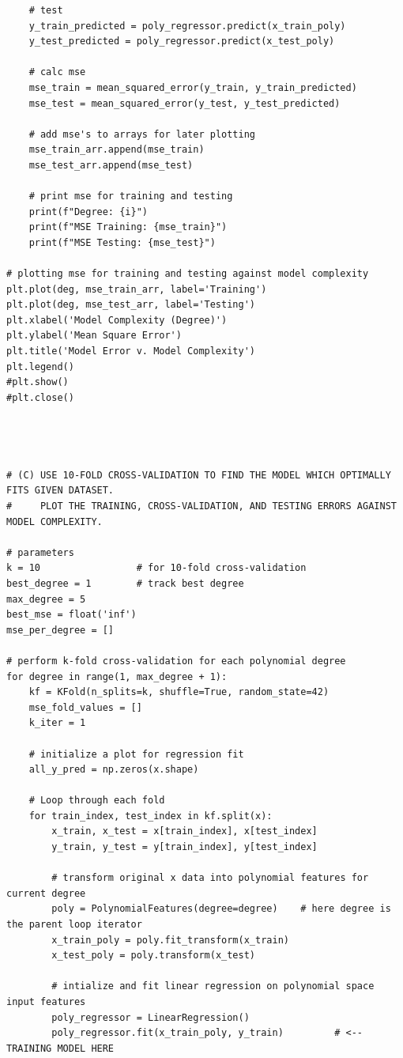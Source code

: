 \documentclass[11pt]{article}
\begin{document}
\begin{lstlisting}
    # test
    y_train_predicted = poly_regressor.predict(x_train_poly)
    y_test_predicted = poly_regressor.predict(x_test_poly)

    # calc mse
    mse_train = mean_squared_error(y_train, y_train_predicted)
    mse_test = mean_squared_error(y_test, y_test_predicted)

    # add mse's to arrays for later plotting
    mse_train_arr.append(mse_train)
    mse_test_arr.append(mse_test)

    # print mse for training and testing
    print(f"Degree: {i}")
    print(f"MSE Training: {mse_train}")
    print(f"MSE Testing: {mse_test}")

# plotting mse for training and testing against model complexity
plt.plot(deg, mse_train_arr, label='Training')
plt.plot(deg, mse_test_arr, label='Testing')
plt.xlabel('Model Complexity (Degree)')
plt.ylabel('Mean Square Error')
plt.title('Model Error v. Model Complexity')
plt.legend()
#plt.show()
#plt.close()




# (C) USE 10-FOLD CROSS-VALIDATION TO FIND THE MODEL WHICH OPTIMALLY FITS GIVEN DATASET.
#     PLOT THE TRAINING, CROSS-VALIDATION, AND TESTING ERRORS AGAINST MODEL COMPLEXITY.

# parameters
k = 10                 # for 10-fold cross-validation
best_degree = 1        # track best degree
max_degree = 5
best_mse = float('inf')
mse_per_degree = []

# perform k-fold cross-validation for each polynomial degree
for degree in range(1, max_degree + 1):
    kf = KFold(n_splits=k, shuffle=True, random_state=42)
    mse_fold_values = []
    k_iter = 1

    # initialize a plot for regression fit
    all_y_pred = np.zeros(x.shape)

    # Loop through each fold
    for train_index, test_index in kf.split(x):
        x_train, x_test = x[train_index], x[test_index]
        y_train, y_test = y[train_index], y[test_index] 

        # transform original x data into polynomial features for current degree
        poly = PolynomialFeatures(degree=degree)    # here degree is the parent loop iterator
        x_train_poly = poly.fit_transform(x_train)
        x_test_poly = poly.transform(x_test)

        # intialize and fit linear regression on polynomial space input features
        poly_regressor = LinearRegression()
        poly_regressor.fit(x_train_poly, y_train)         # <-- TRAINING MODEL HERE


\end{lstlisting}
\end{document}
